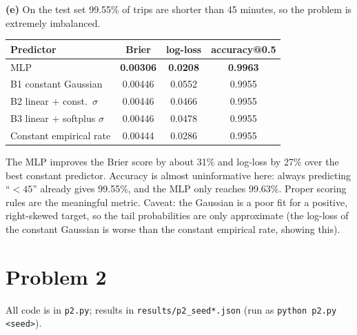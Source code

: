 \documentclass{article}
\newcounter{code}[section]
\begin{document}
\begin{solution}[]
  \textbf{(e)} On the test set 99.55\% of trips are shorter than 45 minutes, so the problem is extremely imbalanced.
  \begin{center}
    \begin{tabular}{lccc}
      Predictor & Brier & log-loss & accuracy@0.5 \\ \hline
      MLP & \textbf{0.00306} & \textbf{0.0208} & \textbf{0.9963} \\
      B1 constant Gaussian & 0.00446 & 0.0552 & 0.9955 \\
      B2 linear + const.\ $\sigma$ & 0.00446 & 0.0466 & 0.9955 \\
      B3 linear + softplus $\sigma$ & 0.00446 & 0.0478 & 0.9955 \\
      Constant empirical rate & 0.00444 & 0.0286 & 0.9955
    \end{tabular}
  \end{center}
  The MLP improves the Brier score by about 31\% and log-loss by 27\% over the best constant predictor. Accuracy is almost uninformative here: always predicting ``$<45$'' already gives 99.55\%, and the MLP only reaches 99.63\%. Proper scoring rules are the meaningful metric. Caveat: the Gaussian is a poor fit for a positive, right-skewed target, so the tail probabilities are only approximate (the log-loss of the constant Gaussian is worse than the constant empirical rate, showing this).
\end{solution}

\section{Problem 2}

All code is in \texttt{p2.py}; results in \texttt{results/p2\_seed*.json} (run as \texttt{python p2.py <seed>}).
\end{document}
